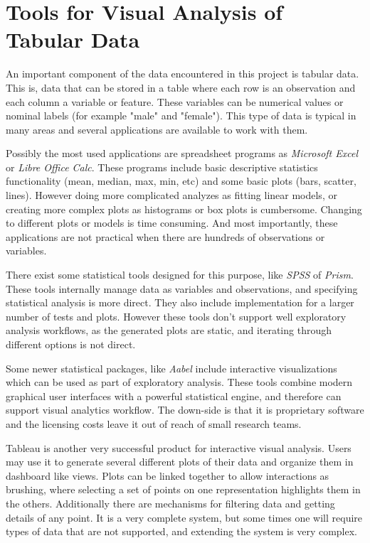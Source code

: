 \section{Tools for Visual Analysis of Tabular Data}

An important component of the data encountered in this project is tabular data. This is, data that can be stored in a table where each row is an observation and each column a variable or feature. These variables can be numerical values or nominal labels (for example "male" and "female"). This type of data is typical in many areas and several applications are available to work with them.

Possibly the most used applications are spreadsheet programs as \emph{Microsoft Excel} or \emph{Libre Office Calc}. These programs include basic descriptive statistics functionality (mean, median, max, min, etc) and some basic plots (bars, scatter, lines). However doing more complicated analyzes as fitting linear models, or creating more complex plots as histograms or box plots is cumbersome. Changing to different plots or models is time consuming. And most importantly, these applications are not practical when there are hundreds of observations or variables. 


There exist some statistical tools designed for this purpose, like \emph{SPSS} of \emph{Prism}. These tools internally manage data as variables and observations, and specifying statistical analysis is more direct. They also include implementation for a larger number of tests and plots. However these tools don't support well exploratory analysis workflows, as the generated plots are static, and iterating through different options is not direct.


Some newer statistical packages, like \emph{Aabel} include interactive visualizations which can be used as part of exploratory analysis. These tools combine modern graphical user interfaces with a powerful statistical engine, and therefore can support visual analytics workflow. The down-side is that it is proprietary software and the licensing costs leave it out of reach of small research teams.	


Tableau \autocite{hanrahan_tableau_2003} is another very successful  product for interactive visual analysis. Users may use it to generate several different plots of their data and organize them in dashboard like views. Plots can be linked together to allow interactions as brushing, where selecting a set of points on one representation highlights them in the others. Additionally there are mechanisms for filtering data and getting details of any point. 
It is a very complete system, but some times one will require types of data that are not supported, and extending the system is very complex. 

